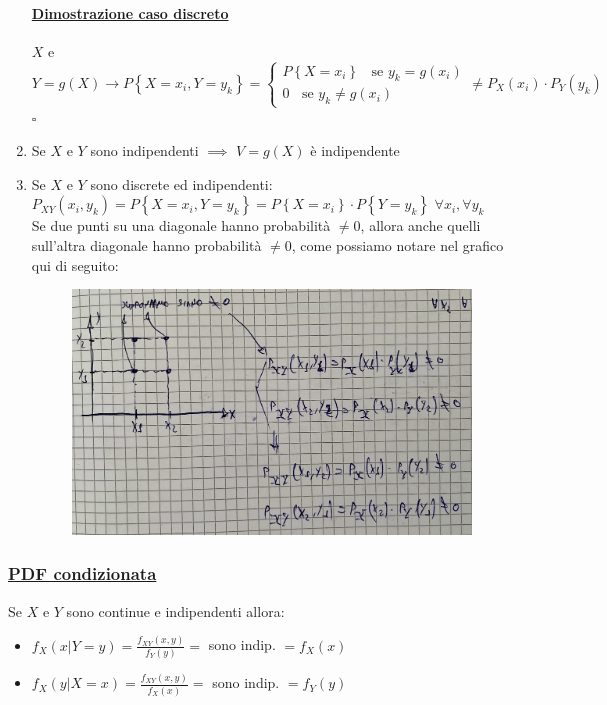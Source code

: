 \documentclass{article}
\begin{document}
\begin{enumerate}
    \paragraph{\underline{Dimostrazione caso discreto}}
    $X$ e $Y=g(X) \rightarrow P\left\{ X = x_i, Y = y_k\right\} = 
    \begin{cases}
        P\left\{ X = x_i \right\}\;\; \text{ se } y_k = g(x_i) \\
        0\;\; \text{ se } y_k \neq g(x_i)
    \end{cases} \neq P_X(x_i) \cdot P_Y(y_k)$ \\
    \hspace*{0pt}\hfill $\square$
    \item Se $X$ e $Y$ sono indipendenti $\implies$ $V = g(X)$ è indipendente 
    \item Se $X$ e $Y$ sono discrete ed indipendenti: \\
    $P_{XY}(x_i,y_k) = P\left\{ X = x_i, Y = y_k \right\} = P\left\{ X = x_i\right\} \cdot P\left\{ Y = y_k\right\}$   $\forall x_i,\forall y_k$ \\
    Se due punti su una diagonale hanno probabilità $\neq 0$, allora anche quelli sull'altra diagonale hanno probabilità $\neq 0$, come possiamo notare nel grafico qui di seguito:
    \begin{figure}[H]
    \centering
    \includegraphics[scale=0.14]{images/81.jpeg}
    \end{figure} 
\end{enumerate}
\subsubsection{\underline{PDF condizionata}}
Se $X$ e $Y$ sono continue e indipendenti allora: 
\begin{itemize}
    \item $f_X(x|Y = y) = \frac{f_{XY}(x,y)}{f_Y(y)} =$ sono indip. $= f_X(x)$
    \item $f_X(y|X = x) = \frac{f_{XY}(x,y)}{f_X(x)} =$ sono indip. $= f_Y(y)$
\end{itemize}
\end{document}
